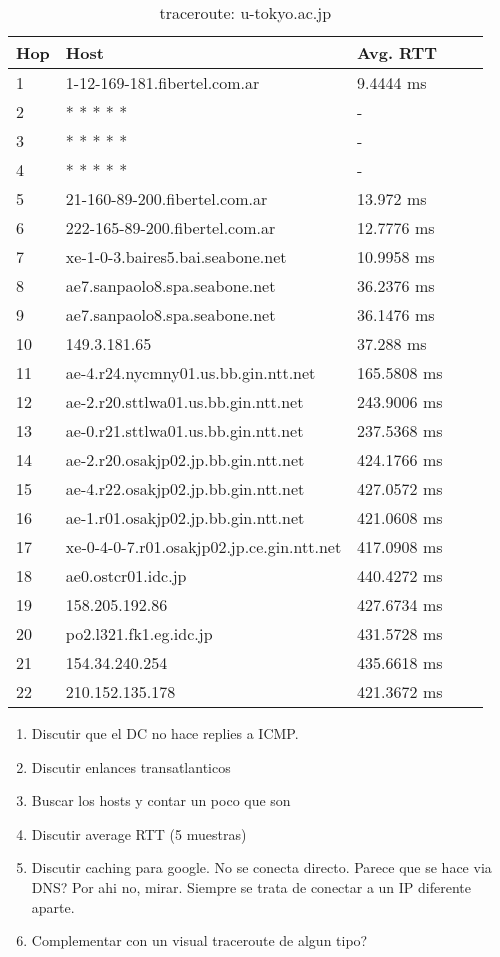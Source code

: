 \begin{table}[H]
\centering
\begin{tabular}{@{}lllll@{}}
\toprule
Hop & Host & Avg. RTT \\ \midrule
1 & 1-12-169-181.fibertel.com.ar & 9.4444 ms\\
2 &  * * * * * & - \\
3 &  * * * * * & - \\
4 &  * * * * * & - \\
5 & 21-160-89-200.fibertel.com.ar & 13.972 ms\\
6 & 222-165-89-200.fibertel.com.ar & 12.7776 ms\\
7 & xe-1-0-3.baires5.bai.seabone.net & 10.9958 ms\\
8 & ae7.sanpaolo8.spa.seabone.net & 36.2376 ms\\
9 & ae7.sanpaolo8.spa.seabone.net & 36.1476 ms\\
10 & 149.3.181.65 & 37.288 ms\\
11 & ae-4.r24.nycmny01.us.bb.gin.ntt.net & 165.5808 ms\\
12 & ae-2.r20.sttlwa01.us.bb.gin.ntt.net & 243.9006 ms\\
13 & ae-0.r21.sttlwa01.us.bb.gin.ntt.net & 237.5368 ms\\
14 & ae-2.r20.osakjp02.jp.bb.gin.ntt.net & 424.1766 ms\\
15 & ae-4.r22.osakjp02.jp.bb.gin.ntt.net & 427.0572 ms\\
16 & ae-1.r01.osakjp02.jp.bb.gin.ntt.net & 421.0608 ms\\
17 & xe-0-4-0-7.r01.osakjp02.jp.ce.gin.ntt.net & 417.0908 ms\\
18 & ae0.ostcr01.idc.jp & 440.4272 ms\\
19 & 158.205.192.86 & 427.6734 ms\\
20 & po2.l321.fk1.eg.idc.jp & 431.5728 ms\\
21 & 154.34.240.254 & 435.6618 ms\\
22 & 210.152.135.178 & 421.3672 ms\\
 \bottomrule
\end{tabular}
\caption{traceroute: u-tokyo.ac.jp}
\label{tokyo}
\end{table}


\begin{enumerate}
	\item Discutir que el DC no hace replies a ICMP.
	\item Discutir enlances transatlanticos
	\item Buscar los hosts y contar un poco que son
	\item Discutir average RTT (5 muestras)
	\item Discutir caching para google. No se conecta directo. Parece que se hace via DNS? Por ahi no, mirar. Siempre se trata de conectar a un IP diferente aparte.
	\item Complementar con un visual traceroute de algun tipo?
\end{enumerate}